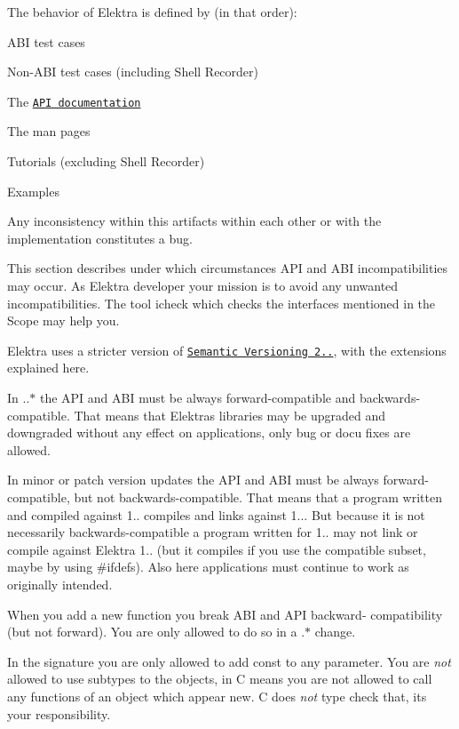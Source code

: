 The behavior of Elektra is defined by (in that order)\+:


\begin{DoxyEnumerate}
\item A\+BI test cases
\item Non-\/\+A\+BI test cases (including Shell Recorder)
\item The \href{https://doc.libelektra.org/api/latest/html/}{\tt A\+PI documentation}
\item The man pages
\item Tutorials (excluding Shell Recorder)
\item Examples
\end{DoxyEnumerate}

Any inconsistency within this artifacts within each other or with the implementation constitutes a bug.

This section describes under which circumstances A\+PI and A\+BI incompatibilities may occur. As Elektra developer your mission is to avoid any unwanted incompatibilities. The tool icheck which checks the interfaces mentioned in the Scope may help you.

Elektra uses a stricter version of \href{https://semver.org/}{\tt Semantic Versioning 2..}, with the extensions explained here.

In {..$\ast$} the A\+PI and A\+BI must be always forward-\/compatible and backwards-\/compatible. That means that Elektra\textquotesingle{}s libraries may be upgraded and downgraded without any effect on applications, only bug or docu fixes are allowed.

In minor or patch version updates the A\+PI and A\+BI must be always forward-\/compatible, but not backwards-\/compatible. That means that a program written and compiled against 1.. compiles and links against 1... But because it is not necessarily backwards-\/compatible a program written for 1.. may not link or compile against Elektra 1.. (but it compiles if you use the compatible subset, maybe by using \#ifdefs). Also here applications must continue to work as originally intended.

When you add a new function you break A\+BI and A\+PI backward-\/ compatibility (but not forward). You are only allowed to do so in a {.$\ast$} change.

In the signature you are only allowed to add const to any parameter. You are {\itshape not} allowed to use subtypes to the objects, in C means you are not allowed to call any functions of an object which appear new. C does {\itshape not} type check that, it\textquotesingle{}s your responsibility.


